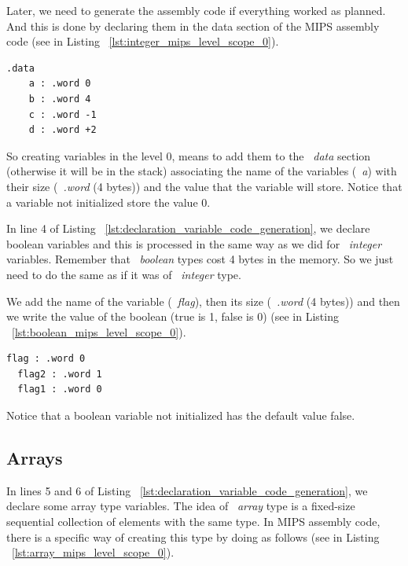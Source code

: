\documentclass[
  oneside,
  11pt, a4paper,
  footinclude=true,
  headinclude=true,
  cleardoublepage=empty
]{scrbook}
\begin{document}
Later, we need to generate the assembly code if everything worked as planned. And this is done by declaring them in the data section of the MIPS assembly code (see in Listing ~\ref{lst:integer_mips_level_scope_0}).

\begin{lstlisting}[caption={Code generation of integer variables in MIPS assembly code},label={lst:integer_mips_level_scope_0}]
  .data
	a : .word 0		
	b : .word 4	
	c : .word -1		
	d : .word +2		
\end{lstlisting}

So creating variables in the level 0, means to add them to the ~\textit{data} section (otherwise it will be in the stack) associating the name of the variables (~\textit{a}) with their size (~\textit{.word} (4 bytes)) and  the value that the variable will store.
Notice that a variable not initialized store the value 0.

In line 4 of Listing ~\ref{lst:declaration_variable_code_generation}, we declare boolean variables and this is processed in the same way as we did for ~\textit{integer} variables.
Remember that ~\textit{boolean} types cost 4 bytes in the memory. So we just need to do the same as if it was of ~\textit{integer} type.

We add the name of the variable (~\textit{flag}), then its size (~\textit{.word} (4 bytes)) and then we write the value of the boolean (true is 1, false is 0) (see in Listing ~\ref{lst:boolean_mips_level_scope_0}).

\begin{lstlisting}[caption={Code generation of boolean variables in MIPS assembly code},label={lst:boolean_mips_level_scope_0}]
  flag : .word 0		
  flag2 : .word 1		
  flag1 : .word 0		
\end{lstlisting}

Notice that a boolean variable not initialized has the default value false.

\subsection*{Arrays}

In lines 5 and 6 of Listing ~\ref{lst:declaration_variable_code_generation}, we declare some array type variables.
The idea of ~\textit{array} type is a fixed-size sequential collection of elements with the same type. 
In MIPS assembly code, there is a specific way of creating this type by doing as follows (see in Listing ~\ref{lst:array_mips_level_scope_0}).
\end{document}
